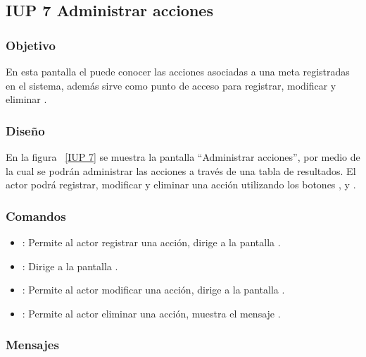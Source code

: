 \subsection{IUP 7 Administrar acciones}

\subsubsection{Objetivo}
	
	En esta pantalla el  puede conocer las acciones asociadas a una meta registradas en el sistema,
	además sirve como punto de acceso para registrar, modificar y eliminar .
	

\subsubsection{Diseño}

    En la figura ~\ref{IUP 7} se muestra la pantalla ``Administrar acciones'', por medio de la cual 
    se podrán administrar las acciones a través de una tabla de resultados.
    El actor podrá registrar, modificar y eliminar una acción utilizando los botones , \botEdit y \botKo. \\
    


\subsubsection{Comandos}
\begin{itemize}
	\item {}: Permite al actor registrar una acción, dirige a la pantalla .
	\item {}: Dirige a la pantalla .
	\item {}: Permite al actor modificar una acción, dirige a la pantalla .
	\item {}: Permite al actor eliminar una acción, muestra el mensaje .
	
\end{itemize}

\subsubsection{Mensajes}

